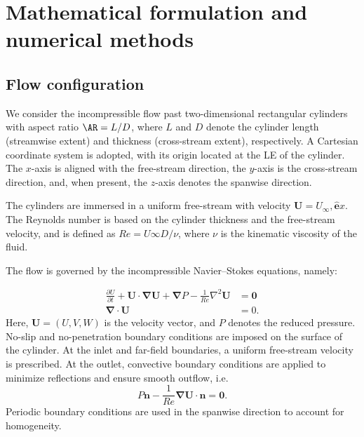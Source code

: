 \section{Mathematical formulation and numerical methods}
\label{sec:methods}

\subsection{Flow configuration}
We consider the incompressible flow past two-dimensional rectangular cylinders with aspect ratio $\AR = L/D$, where $L$ and $D$ denote the cylinder length (streamwise extent) and thickness (cross-stream extent), respectively. A Cartesian coordinate system is adopted, with its origin located at the LE of the cylinder. The $x$-axis is aligned with the free-stream direction, the $y$-axis is the cross-stream direction, and, when present, the $z$-axis denotes the spanwise direction.

The cylinders are immersed in a uniform free-stream with velocity $\boldsymbol{U} = U_\infty , \hat{\boldsymbol{e}}x$. The Reynolds number is based on the cylinder thickness and the free-stream velocity, and is defined as $Re = U\infty D / \nu$, where $\nu$ is the kinematic viscosity of the fluid.

The flow is governed by the incompressible Navier–Stokes equations, namely:
%

\begin{equation}
\begin{aligned}
\frac{\partial U}{\partial t} + \bm{U} \cdot \bm{\nabla}\bm{U} + \bm{\nabla} P - \frac{1}{Re} \nabla^2 \bm{U} & = \bm{0} \\
\bm{\nabla} \cdot \bm{U} & = 0.
\end{aligned}
\label{eq:NSequations}
\end{equation}
%
Here, $\boldsymbol{U} = (U, V, W)$ is the velocity vector, and $P$ denotes the reduced pressure. No-slip and no-penetration boundary conditions are imposed on the surface of the cylinder. At the inlet and far-field boundaries, a uniform free-stream velocity is prescribed. At the outlet, convective boundary conditions are applied to minimize reflections and ensure smooth outflow, i.e.
% 
\begin{equation*}
P \bm{n} - \frac{1}{Re} \bm{\nabla} \bm{U} \cdot \bm{n} = \bm{0}.
\end{equation*}
%
Periodic boundary conditions are used in the spanwise direction to account for homogeneity.

